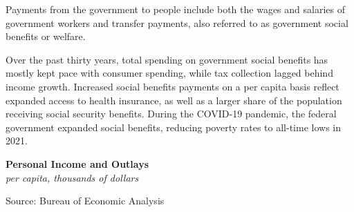\documentclass{report}
\makeatletter
\newcommand{\tbllink}[1]{\href{https://raw.githubusercontent.com/bdecon/US-chartbook/master/chartbook/data/#1}{\faTable}}
\newcommand*\short[1]{\expandafter\@gobbletwo\number\numexpr#1\relax}
\newcommand{\stdnode}[3]{\node[below, align=left, shift=({#1,#2})]{#3};}
\newcommand{\absnode}[3]{\node[below right, align=left] at (axis cs: #1,#2) {#3};}
\newcommand{\shdateaxisticks}{
		date coordinates in=x, axis line style={draw=none},
		xmax={2024-01-31},
		max space between ticks=40,	    
		xtick={{1990-01-01}, {1995-01-01}, {2000-01-01}, 
			{2005-01-01}, {2010-01-01}, {2015-01-01}, {2020-01-01}},
		minor xtick={},
		enlarge y limits={0.06}, enlarge x limits={0.01},
		xticklabel style={align=center, yshift=-2pt}, tick label style={inner sep=0pt},
		}
\newcommand{\bbar}[2]{extra #1 ticks = {{#2}}, extra #1 tick labels = ,
		extra #1 tick style = {grid=major, grid style={thick, black!25}},}
\newcommand{\stdline}[4]{\addplot[very thick, no markers, color=#1] 
		table [x=#2, y=#3, col sep=comma] {#4};	}
\newcommand{\rbars}{
		\fill[color=black!10] (axis cs:{1990-07-01},\pgfkeysvalueof{/pgfplots/ymin})
			rectangle (axis cs:{1991-03-01}, \pgfkeysvalueof{/pgfplots/ymax});
		\fill[color=black!10] (axis cs:{2007-12-01},\pgfkeysvalueof{/pgfplots/ymin})
			rectangle (axis cs:{2009-07-01}, \pgfkeysvalueof{/pgfplots/ymax});
		\fill[color=black!10] (axis cs:{2001-03-01},\pgfkeysvalueof{/pgfplots/ymin})
			rectangle (axis cs:{2001-11-01}, \pgfkeysvalueof{/pgfplots/ymax});
		\fill[color=black!10] (axis cs:{2020-02-01},\pgfkeysvalueof{/pgfplots/ymin})
			rectangle (axis cs:{2020-05-01}, \pgfkeysvalueof{/pgfplots/ymax});}
\makeatother
\begin{document}
{\begin{minipage}{1.0\textwidth}
\small Payments from the government to people include both the wages and salaries of government workers and transfer payments, also referred to as government social benefits or welfare.

Over the past thirty years, total spending on government social benefits has mostly kept pace with consumer spending, while tax collection lagged behind income growth. Increased social benefits payments on a per capita basis reflect expanded access to health insurance, as well as a larger share of the population receiving social security benefits. During the COVID-19 pandemic, the federal government expanded social benefits, reducing poverty rates to all-time lows in 2021. 
\end{minipage}
\vspace{1mm}

\begin{minipage}{0.38\textwidth}
\normalsize \textbf{Personal Income and Outlays}\\
\footnotesize{\textit{per capita, thousands of dollars}}
\vspace{3.5cm}

\hspace{2mm} 

\footnotesize{Source: Bureau of Economic Analysis} \hfill \tbllink{govpi.csv}
\end{minipage}\hspace{5mm}
\begin{minipage}{0.34\textwidth}
\small 
\end{minipage}
\vspace{3mm}

}
\end{document}
